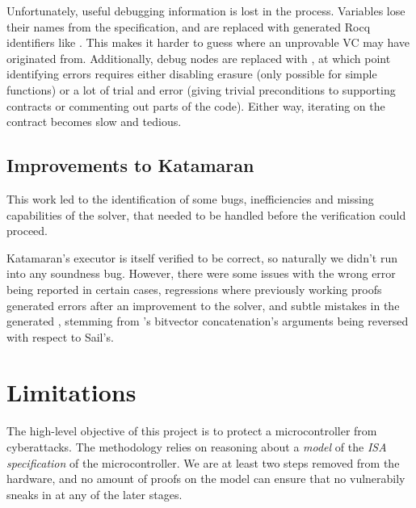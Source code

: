 Unfortunately, useful debugging information is lost in the process. Variables lose their names from the \usail specification, and are replaced with generated Rocq identifiers like . This makes it harder to guess where an unprovable VC may have originated from. Additionally, debug nodes are replaced with , at which point identifying errors requires either disabling erasure (only possible for simple functions) or a lot of trial and error (\eg giving trivial preconditions to supporting contracts or commenting out parts of the code). Either way, iterating on the contract becomes slow and tedious.

\subsection{Improvements to Katamaran}

This work led to the identification of some bugs, inefficiencies and missing capabilities of the solver, that needed to be handled before the verification could proceed.

Katamaran's executor is itself verified to be correct, so naturally we didn't run into any soundness bug. However, there were some issues with the wrong error being reported in certain cases, regressions where previously working proofs generated errors after an improvement to the solver, and subtle mistakes in the generated \usail, stemming \eg from \usail's bitvector concatenation's arguments being reversed with respect to Sail's.





\section{Limitations}


The high-level objective of this project is to protect a microcontroller from cyberattacks. The methodology relies on reasoning about a \emph{model} of the \emph{ISA specification} of the microcontroller. We are at least two steps removed from the hardware, and no amount of proofs on the model can ensure that no vulnerabily sneaks in at any of the later stages.

